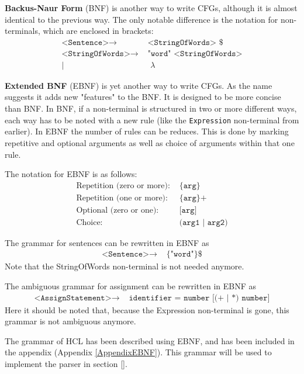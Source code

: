 \textbf{Backus-Naur Form} (BNF) is another way to write CFGs, although it is almost identical to the previous way. The only notable difference is the notation for non-terminals, which are enclosed in brackets:
\begin{align*}
	\texttt{<Sentence>}\to & \texttt{ <StringOfWords> \$}\\
	\texttt{<StringOfWords>}\to & \texttt{ "word" <StringOfWords>}\\
	| & \texttt{ }\lambda
\end{align*}

\textbf{Extended BNF} (EBNF) is yet another way to write CFGs. As the name suggests it adds new "features" to the BNF.
It is designed to be more concise than BNF.
In BNF, if a non-terminal is structured in two or more different ways, each way has to be noted with a new rule (like the \texttt{Expression} non-terminal from earlier).
In EBNF the number of rules can be reduces.
This is done by marking repetitive and optional arguments as well as choice of arguments within that one rule.
\cite{SebestaEBNF}

The notation for EBNF is as follows:
\begin{align*}
	\text{Repetition (zero or more):} & \texttt{ \{arg\}}\\
	\text{Repetition (one or more):} & \texttt{ \{arg\}+}\\
	\text{Optional (zero or one):} & \texttt{ [arg]}\\
	\text{Choice:} & \texttt{ (arg1 | arg2)}
\end{align*}

The grammar for sentences can be rewritten in EBNF as
\begin{align*}
	\texttt{<Sentence>}\to & \texttt{ \{"word"\} \$}
\end{align*}
Note that the StringOfWords non-terminal is not needed anymore.

The ambiguous grammar for assignment can be rewritten in EBNF as
\begin{align*}
	\texttt{<AssignStatement>}\to & \texttt{ identifier = number [(+ | *) number]}
\end{align*}
Here it should be noted that, because the Expression non-terminal is gone, this grammar is not ambiguous anymore.

The grammar of HCL has been described using EBNF, and has been included in the appendix (Appendix \ref{AppendixEBNF}).
This grammar will be used to implement the parser in section \ref{}.
